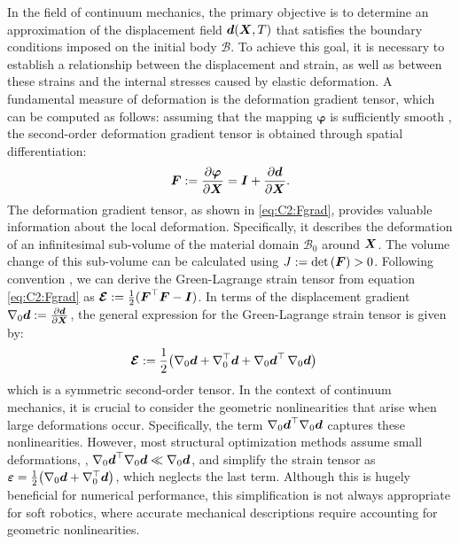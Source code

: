 In the field of continuum mechanics, the primary objective is to determine an approximation of the displacement field ${\boldsymbol{d}}({\boldsymbol{X}},T)$ that satisfies the boundary conditions imposed on the initial body $\mathcal{B}$. To achieve this goal, it is necessary to establish a relationship between the displacement and strain, as well as between these strains and the internal stresses caused by elastic deformation. A fundamental measure of deformation is the deformation gradient tensor, which can be computed as follows: assuming that the mapping $\boldsymbol{\varphi}$ is sufficiently smooth \cite{Kim2018,Holzapfel2002}, the second-order deformation gradient tensor is obtained through spatial differentiation:
%
\begin{align}
\boldsymbol{F} := \frac{\partial \boldsymbol{\varphi} }{\partial \boldsymbol{X}}   = \boldsymbol{I} + \frac{\partial {\boldsymbol{d}} }{\partial \boldsymbol{X}}.
\label{eq:C2:Fgrad}
\end{align}
%
The deformation gradient tensor, as shown in \eqref{eq:C2:Fgrad}, provides valuable information about the local deformation. Specifically, it describes the deformation of an infinitesimal sub-volume of the material domain $\mathcal{B}_0$ around ${\boldsymbol{X}}$. The volume change of this sub-volume can be calculated using $J := \textnormal{det}\left( {{\boldsymbol{F}}} \right) > 0$. Following convention \cite{Kim2018,Holzapfel2002}, we can derive the Green-Lagrange strain tensor from equation \eqref{eq:C2:Fgrad} as ${\boldsymbol{\mathcal{E}}} : = \frac{1}{2}({\boldsymbol{F}}^\top {\boldsymbol{F}} - \boldsymbol{I})$. In terms of the displacement gradient $\nabla_{0} {\boldsymbol{d}} := \tfrac{\partial {\boldsymbol{d}}}{\partial {\boldsymbol{X}}}$, the general expression for the Green-Lagrange strain tensor is given by:
%
\begin{align}
\boldsymbol{\mathcal{E}} & := \frac{1}{2}\big( \nabla_0 {\boldsymbol{d}}  +\nabla_0^\top {\boldsymbol{d}}  + \nabla_0 {\boldsymbol{d}}^\top \, \nabla_0 {\boldsymbol{d}} \big)
\label{eq:E_tens}
\end{align}
%
which is a symmetric second-order tensor. In the context of continuum mechanics, it is crucial to consider the geometric nonlinearities that arise when large deformations occur. Specifically, the term $\nabla_0 {\boldsymbol{d}}^\top \nabla_0 {\boldsymbol{d}}$ captures these nonlinearities. However, most structural optimization methods assume small deformations, \ie, $\nabla_0 {\boldsymbol{d}}^\top \nabla_0 {\boldsymbol{d}} \ll \nabla_0 {\boldsymbol{d}}$, and simplify the strain tensor as $\boldsymbol{\varepsilon} = \tfrac{1}{2}\big( \nabla_0 {\boldsymbol{d}} + \nabla_0^\top {\boldsymbol{d}} \big)$, which neglects the last term. Although this is hugely beneficial for numerical performance, this simplification is not always appropriate for soft robotics, where accurate mechanical descriptions require accounting for geometric nonlinearities.

